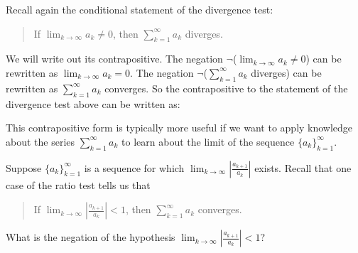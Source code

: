 \documentclass{ximera}
\begin{document}
\begin{exercise}
\begin{exercise}
Recall again the conditional statement of the divergence test:

\begin{quote}
If $\lim_{k \rightarrow \infty} a_k \neq 0$, then $\sum_{k = 1}^\infty a_k$ diverges.
\end{quote}

We will write out its contrapositive.  The negation $\neg$($\lim_{k \rightarrow \infty} a_k \neq 0$) can be rewritten as $\lim_{k \rightarrow \infty} a_k = 0$.  The negation $\neg$($\sum_{k = 1}^\infty a_k$ diverges) can be rewritten as $\sum_{k = 1}^\infty a_k$ converges.  So the contrapositive to the statement of the divergence test above can be written as:

\begin{multipleChoice}
\end{multipleChoice}

This contrapositive form is typically more useful if we want to apply knowledge about the series $\sum_{k = 1}^\infty a_k$ to learn about the limit of the sequence $\{a_k\}_{k = 1}^\infty$.

Suppose $\{a_k\}_{k = 1}^\infty$ is a sequence for which $\lim_{k \rightarrow \infty} \left\lvert \frac{a_{k + 1}}{a_k} \right\rvert$ exists.  Recall that one case of the ratio test tells us that

\begin{quote}
If $\lim_{k \rightarrow \infty} \left\lvert \frac{a_{k + 1}}{a_k} \right\rvert < 1$, then $\sum_{k = 1}^\infty a_k$ converges.
\end{quote}

What is the negation of the hypothesis $\lim_{k \rightarrow \infty} \left\lvert \frac{a_{k + 1}}{a_k} \right\rvert < 1$?

\begin{multipleChoice}
\end{multipleChoice}


\end{exercise}
\end{exercise}
\end{document}
